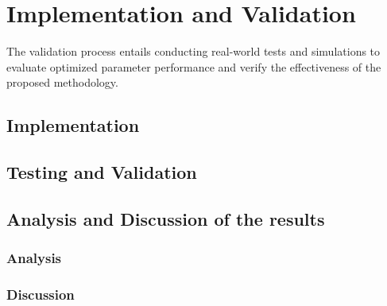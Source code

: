 \chapter{Implementation and Validation}%
The validation process entails conducting real-world tests and simulations to evaluate optimized parameter performance and verify the effectiveness of the proposed methodology.
\section{Implementation}%

\section{Testing and Validation}%

\section{Analysis and Discussion of the results}%


\subsection{Analysis}
\subsection{Discussion}%